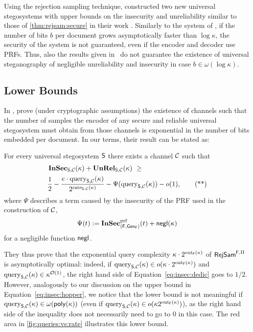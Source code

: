 Using the rejection sampling technique, 
\citeauthor{dedic2009lower} constructed two new universal
stegosystems with upper bounds on the insecurity and unreliability
similar to those of \autoref{thm:rejsam:secure} in their work
\cite{dedic2009lower}. 
Similarly to the system of \citeauthor{hopper2009provably}, if the
number of bits $b$ per document grows asymptotically faster than
$\log \kappa$, the security of the system is not guaranteed, even if the
encoder and decoder use \acp{PRF}.
Thus, also the results given in~\cite{dedic2009lower} do not
guarantee the existence of universal steganography of 
negligible unreliability and insecurity in case $b \in \omega(\log \kappa)$.

\subsection*{Lower Bounds}

In \cite{dedic2009lower}, \citeauthor{dedic2009lower} prove (under cryptographic
assumptions) the existence of channels
such that the number of samples the encoder of any
secure and reliable universal stegosystem must obtain from those 
channels is exponential in the number of bits embedded 
per document. In our terms, their result can be stated as:
\begin{theorem} 
\label{thm:lower_bound_crypto}
  For every universal
  stegosystem $\operatorname{\mathsf{S}}$ 
  there exists a channel $\mathcal{C}$ such that  
  \begin{align*} 
    &\InSec_{\Steg,\chan}(\kappa) + \unrel_{\Steg,\chan}(\kappa) \ \ge\\
    &\frac{1}{2} - \frac{e\cdot \query_{\Steg,\chan}(\kappa)}{2^{\rate_{\Steg,\chan}(\kappa)}} -\Psi(\query_{\Steg,\chan}(\kappa)) - o(1),     \tag{**}
    \label{eq:insec:dedic}
  \end{align*}
  where $\Psi$ describes a term caused by the insecurity
  of the \ac{PRF} used in the construction of $\mathcal{C}$, \ie
  \begin{align*}
    \Psi(t) := \operatorname{\mathbf{InSec}}^{\operatorname{prf}}_{(\operatorname{\mathsf{F}},\operatorname{\mathsf{Gen}}_{\operatorname{\mathsf{F}}})}(t)+\operatorname{\mathsf{negl}}(\kappa)
  \end{align*}
for a negligible function $\operatorname{\mathsf{negl}}$. 
\end{theorem}

They thus prove that the exponential query complexity
$\kappa \cdot 2^{\operatorname{out}_{\operatorname{\mathsf{F}}}(\kappa)}$ of $\operatorname{\mathsf{RejSam}}^{\operatorname{\mathsf{F}},\Pi}$ is asymptotically
optimal: indeed, if
$\operatorname{query}_{\operatorname{\mathsf{S}},\mathcal{C}}(\kappa) \in o(\kappa \cdot 2^{\operatorname{out}_{\operatorname{\mathsf{F}}}(\kappa)})$ and
$\operatorname{query}_{\operatorname{\mathsf{S}},\mathcal{C}}(\kappa)\in \kappa^{\mathcal{O}(1)}$, the right hand
side of Equation~\eqref{eq:insec:dedic} goes to $1/2$. However, analogously to our discussion on
the upper bound in Equation~\eqref{eq:insec:hopper}, we notice that the lower bound is not meaningful if
$\operatorname{query}_{\operatorname{\mathsf{S}},\mathcal{C}}(\kappa)\in \omega(\operatorname{\mathsf{poly}}(\kappa))$ (even if
$\operatorname{query}_{\operatorname{\mathsf{S}},\mathcal{C}}(\kappa)\in o(\kappa 2^{\operatorname{out}_{\operatorname{\mathsf{F}}}(\kappa)})$), as the right
hand side of the inequality does not necessarily need to go to $0$ in
this case.  The red area in \autoref{fig:queries:vs:rate} illustrates
this lower bound.


